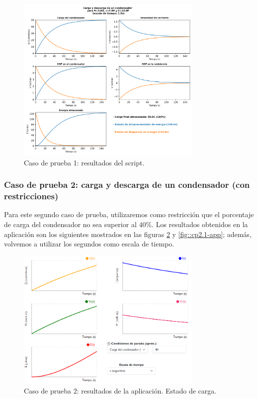 \documentclass[../main.tex]{subfiles}
\begin{document}
\begin{figure}[!h]
    \centering
    \includegraphics[width=0.8\textwidth]{images/cp1-py.png}
    \caption{Caso de prueba 1: resultados del script. }
    \label{fig::cp1.1-py}
\end{figure}

\subsubsection{Caso de prueba 2: carga y descarga de un condensador (con restricciones)}
Para este segundo caso de prueba, utilizaremos como restricción que el porcentaje de carga del condensador no sea superior al $40\%$. Los resultados obtenidos en la aplicación son los siguientes mostrados en las figuras \ref{fig::cp2-app} y \ref{fig::cp2.1-app}; además, volvemos a utilizar los segundos como escala de tiempo.\\ 

\begin{figure}[!h]
    \centering
    \includegraphics[width=0.8\textwidth]{images/cp2-app.PNG}
    \caption{Caso de prueba 2: resultados de la aplicación. Estado de carga.}
    \label{fig::cp2-app}
\end{figure}
\end{document}
